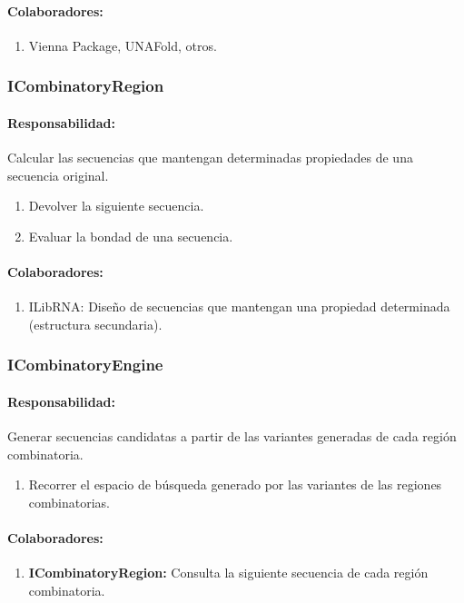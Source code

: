     \paragraph{Colaboradores:}
      \begin{enumerate}
       \item Vienna Package, UNAFold, otros.
      \end{enumerate}

  \subsubsection{ICombinatoryRegion}
    \paragraph{Responsabilidad:} Calcular las secuencias que mantengan
determinadas propiedades de una secuencia original.    
      \begin{enumerate}
       \item Devolver la siguiente secuencia.
       \item Evaluar la bondad de una secuencia.
      \end{enumerate}
    \paragraph{Colaboradores:}
      \begin{enumerate}
       \item ILibRNA: Dise\~no de secuencias que mantengan una propiedad
determinada (estructura secundaria).
      \end{enumerate}

  \subsubsection{ICombinatoryEngine}
    \paragraph{Responsabilidad:} Generar secuencias candidatas a partir de las
variantes generadas de cada regi\'on combinatoria.   
      \begin{enumerate}       
       \item Recorrer el espacio de b\'usqueda generado por las variantes de
las regiones combinatorias.
      \end{enumerate}
    \paragraph{Colaboradores:}
      \begin{enumerate}
       \item \textbf{ICombinatoryRegion:} Consulta la siguiente secuencia de
cada regi\'on combinatoria.
      \end{enumerate} 

